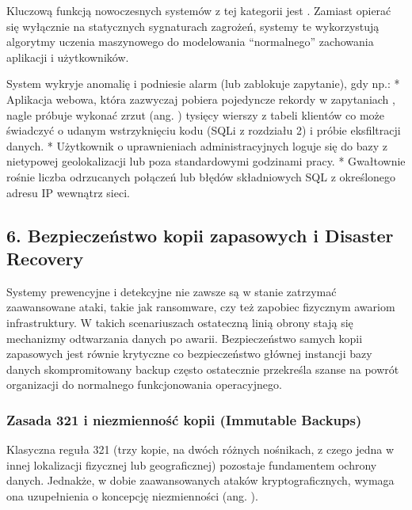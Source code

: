 \documentclass[a4paper,11pt,english,openany,oneside]{sphinxmanual}
\begin{document}
\sphinxAtStartPar
Kluczową funkcją nowoczesnych systemów z tej kategorii jest . Zamiast opierać się wyłącznie na statycznych sygnaturach zagrożeń, systemy te wykorzystują algorytmy uczenia maszynowego do modelowania “normalnego” zachowania aplikacji i użytkowników.

\sphinxAtStartPar
System wykryje anomalię i podniesie alarm (lub zablokuje zapytanie), gdy np.:
* Aplikacja webowa, która zazwyczaj pobiera pojedyncze rekordy w zapytaniach , nagle próbuje wykonać zrzut (ang. ) tysięcy wierszy z tabeli klientów \textendash{} co może świadczyć o udanym wstrzyknięciu kodu (SQLi z rozdziału 2) i próbie eksfiltracji danych.
* Użytkownik o uprawnieniach administracyjnych loguje się do bazy z nietypowej geolokalizacji lub poza standardowymi godzinami pracy.
* Gwałtownie rośnie liczba odrzucanych połączeń lub błędów składniowych SQL z określonego adresu IP wewnątrz sieci.

\sphinxstepscope


\subsection{6. Bezpieczeństwo kopii zapasowych i Disaster Recovery}
\label{\detokenize{rozdzial_2/rozdzial_27/rozdzial_6:bezpieczenstwo-kopii-zapasowych-i-disaster-recovery}}\label{\detokenize{rozdzial_2/rozdzial_27/rozdzial_6::doc}}
\sphinxAtStartPar
Systemy prewencyjne i detekcyjne nie zawsze są w stanie zatrzymać zaawansowane ataki, takie jak ransomware, czy też zapobiec fizycznym awariom infrastruktury. W takich scenariuszach ostateczną linią obrony stają się mechanizmy odtwarzania danych po awarii. Bezpieczeństwo samych kopii zapasowych jest równie krytyczne co bezpieczeństwo głównej instancji bazy danych \textendash{} skompromitowany backup często ostatecznie przekreśla szanse na powrót organizacji do normalnego funkcjonowania operacyjnego.


\subsubsection{Zasada 3\sphinxhyphen{}2\sphinxhyphen{}1 i niezmienność kopii (Immutable Backups)}
\label{\detokenize{rozdzial_2/rozdzial_27/rozdzial_6:zasada-3-2-1-i-niezmiennosc-kopii-immutable-backups}}
\sphinxAtStartPar
Klasyczna reguła 3\sphinxhyphen{}2\sphinxhyphen{}1 (trzy kopie, na dwóch różnych nośnikach, z czego jedna w innej lokalizacji fizycznej lub geograficznej) pozostaje fundamentem ochrony danych. Jednakże, w dobie zaawansowanych ataków kryptograficznych, wymaga ona uzupełnienia o koncepcję niezmienności (ang. ).
\end{document}
